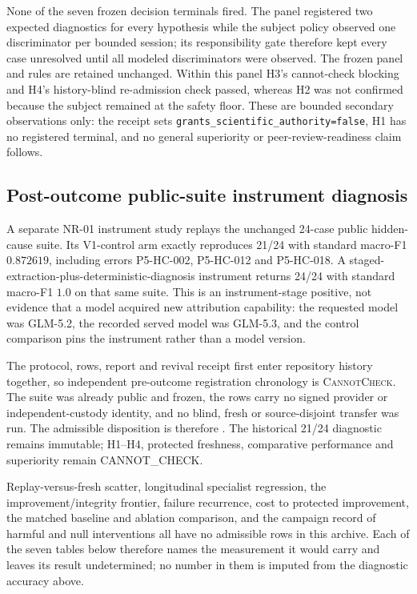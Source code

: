 None of the seven frozen decision terminals fired. The panel registered two
expected diagnostics for every hypothesis while the subject policy observed
one discriminator per bounded session; its responsibility gate therefore kept
every case unresolved until all modeled discriminators were observed. The
frozen panel and rules are retained unchanged. Within this panel H3's
cannot-check blocking and H4's history-blind re-admission check passed, whereas
H2 was not confirmed because the subject remained at the safety floor. These
are bounded secondary observations only: the receipt sets
\texttt{grants\_scientific\_authority=false}, H1 has no registered terminal,
and no general superiority or peer-review-readiness claim follows.

\subsection*{Post-outcome public-suite instrument diagnosis}

A separate NR-01 instrument study replays the unchanged 24-case public
hidden-cause suite. Its V1-control arm exactly reproduces 21/24 with standard
macro-F1 $0.872619$, including errors P5-HC-002, P5-HC-012 and P5-HC-018. A
staged-extraction-plus-deterministic-diagnosis instrument returns 24/24 with
standard macro-F1 $1.0$ on that same suite. This is an instrument-stage
positive, not evidence that a model acquired new attribution capability: the
requested model was GLM-5.2, the recorded served model was GLM-5.3, and the
control comparison pins the instrument rather than a model version.

The protocol, rows, report and revival receipt first enter repository history
together, so independent pre-outcome registration chronology is
\textsc{CannotCheck}. The suite was already public and frozen, the rows carry
no signed provider or independent-custody identity, and no blind, fresh or
source-disjoint transfer was run. The admissible disposition is therefore
. The historical
21/24 diagnostic remains immutable; H1--H4, protected freshness, comparative
performance and superiority remain \textsf{CANNOT\_CHECK}.




Replay-versus-fresh scatter, longitudinal specialist regression, the improvement/integrity frontier, failure recurrence, cost to protected improvement, the matched baseline and ablation comparison, and the campaign record of harmful and null interventions all have no admissible rows in this archive. Each of the seven tables below therefore names the measurement it would carry and leaves its result undetermined; no number in them is imputed from the diagnostic accuracy above.








